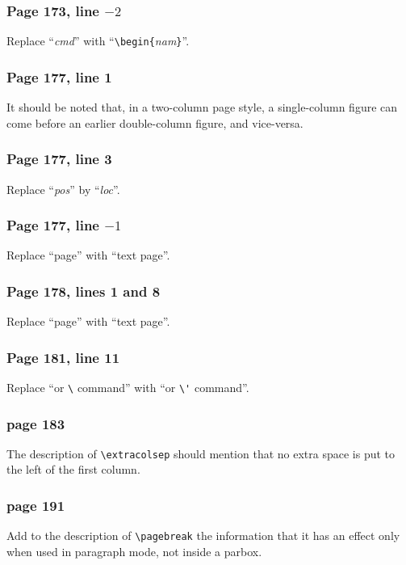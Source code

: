 \subsubsection*{Page 173, line $-2$}
Replace ``{\em cmd\/}'' with ``\verb|\begin{|{\em nam\/}\verb|}|''.

\subsubsection*{Page 177, line 1}
It should be noted that, in a two-column page style, a single-column
figure can come before an earlier double-column figure, and vice-versa.

\subsubsection*{Page 177, line 3}
Replace ``{\em pos\/}'' by ``{\em loc\/}''.

\subsubsection*{Page 177, line $-1$}
Replace ``page'' with ``text page''.

\subsubsection*{Page 178, lines 1 and 8}
Replace ``page'' with ``text page''.  

\subsubsection*{Page 181, line 11}
Replace ``or \verb|\| command'' with ``or \verb|\'| command''.

\subsubsection*{page 183}
The description of \verb|\extracolsep| should mention that no extra
space is put to the left of the first column.

\subsubsection*{page 191}
Add to the description of \verb|\pagebreak| the
information that it has an effect only when used in paragraph mode,
not inside a parbox.

